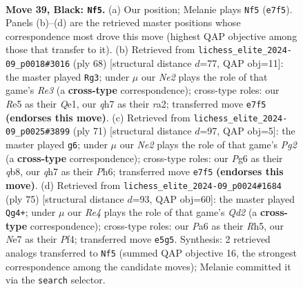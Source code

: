 \documentclass[11pt]{article}
\begin{document}
\begin{figure}[p]\centering
\begin{subfigure}{0.46\textwidth}\centering
\resizebox{\linewidth}{!}{%
\newchessgame
\chessboard[
  setfen={1r6/2R1n2Q/p2p1kp1/3qr2p/1p2p2P/8/4NPP1/R4K2 b - - 5 39},
  showmover=false,
  pgfstyle=straightmove, color=movearrow, markmove={e7-f5}
]}
\caption{}
\end{subfigure}\hfill
\begin{subfigure}{0.46\textwidth}\centering
\resizebox{\linewidth}{!}{%
\newchessgame
\chessboard[
  setfen={8/5pk1/p3p1n1/1p2P3/1P1q2N1/4R2P/r4PPK/4Q3 w - - 0 35},
  showmover=false,
  pgfstyle=straightmove, color=movearrow, markmove={e3-g3}
]}
\caption{}
\end{subfigure}
\\[4pt]
\begin{subfigure}{0.46\textwidth}\centering
\resizebox{\linewidth}{!}{%
\newchessgame
\chessboard[
  setfen={1Q6/5ppk/p3rq1p/1p6/1P6/3Bn2P/R5P1/6K1 b - - 3 36},
  showmover=false,
  pgfstyle=straightmove, color=movearrow, markmove={g7-g6}
]}
\caption{}
\end{subfigure}\hfill
\begin{subfigure}{0.46\textwidth}\centering
\resizebox{\linewidth}{!}{%
\newchessgame
\chessboard[
  setfen={7r/kp1q4/p1n2R2/4p2r/4Qp2/2PP4/P1P1KP2/1R6 b - - 9 38},
  showmover=false,
  pgfstyle=straightmove, color=movearrow, markmove={d7-g4}
]}
\caption{}
\end{subfigure}
\caption{\textbf{Move 39, Black: \texttt{Nf5}.} (a) Our position; Melanie plays \texttt{Nf5} (\texttt{e7f5}). Panels (b)--(d) are the retrieved master positions whose correspondence most drove this move (highest QAP objective among those that transfer to it). (b) Retrieved from \texttt{lichess\_elite\_2024-09\_p0018\#3016} (ply 68) [structural distance $d$=77, QAP obj=11]: the master played \texttt{Rg3}; under $\mu$ our \emph{Ne2} plays the role of that game's \emph{Re3} (a \textbf{cross-type} correspondence); cross-type roles: our \emph{R}e5 as their \emph{Q}e1, our \emph{q}h7 as their \emph{r}a2; transferred move \texttt{e7f5} \textbf{(endorses this move)}. (c) Retrieved from \texttt{lichess\_elite\_2024-09\_p0025\#3899} (ply 71) [structural distance $d$=97, QAP obj=5]: the master played \texttt{g6}; under $\mu$ our \emph{Ne2} plays the role of that game's \emph{Pg2} (a \textbf{cross-type} correspondence); cross-type roles: our \emph{P}g6 as their \emph{q}b8, our \emph{q}h7 as their \emph{P}h6; transferred move \texttt{e7f5} \textbf{(endorses this move)}. (d) Retrieved from \texttt{lichess\_elite\_2024-09\_p0024\#1684} (ply 75) [structural distance $d$=93, QAP obj=60]: the master played \texttt{Qg4+}; under $\mu$ our \emph{Re4} plays the role of that game's \emph{Qd2} (a \textbf{cross-type} correspondence); cross-type roles: our \emph{P}a6 as their \emph{R}h5, our \emph{N}e7 as their \emph{P}f4; transferred move \texttt{e5g5}. Synthesis: 2 retrieved analogs transferred to \texttt{Nf5} (summed QAP objective 16, the strongest correspondence among the candidate moves); Melanie committed it via the \texttt{search} selector.}
\label{fig:thought-m77}
\end{figure}
\end{document}
